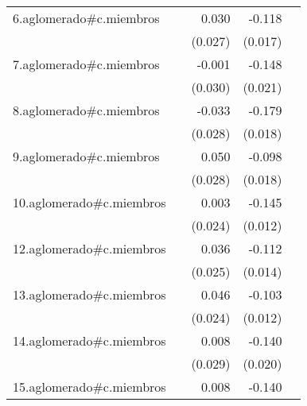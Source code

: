 {\begin{longtable}{l*{4}{D{.}{.}{-1}}}
\addlinespace
6.aglomerado#c.miembros&                     &       0.030         &      -0.118\sym{***}&                     \\
            &                     &     (0.027)         &     (0.017)         &                     \\
\addlinespace
7.aglomerado#c.miembros&                     &      -0.001         &      -0.148\sym{***}&                     \\
            &                     &     (0.030)         &     (0.021)         &                     \\
\addlinespace
8.aglomerado#c.miembros&                     &      -0.033         &      -0.179\sym{***}&                     \\
            &                     &     (0.028)         &     (0.018)         &                     \\
\addlinespace
9.aglomerado#c.miembros&                     &       0.050         &      -0.098\sym{***}&                     \\
            &                     &     (0.028)         &     (0.018)         &                     \\
\addlinespace
10.aglomerado#c.miembros&                     &       0.003         &      -0.145\sym{***}&                     \\
            &                     &     (0.024)         &     (0.012)         &                     \\
\addlinespace
12.aglomerado#c.miembros&                     &       0.036         &      -0.112\sym{***}&                     \\
            &                     &     (0.025)         &     (0.014)         &                     \\
\addlinespace
13.aglomerado#c.miembros&                     &       0.046         &      -0.103\sym{***}&                     \\
            &                     &     (0.024)         &     (0.012)         &                     \\
\addlinespace
14.aglomerado#c.miembros&                     &       0.008         &      -0.140\sym{***}&                     \\
            &                     &     (0.029)         &     (0.020)         &                     \\
\addlinespace
15.aglomerado#c.miembros&                     &       0.008         &      -0.140\sym{***}&                     \\

\end{longtable}}
